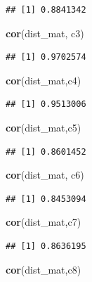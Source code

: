\documentclass[]{article}
\newenvironment{Shaded}{\begin{snugshade}}{\end{snugshade}}
\newcommand{\KeywordTok}[1]{\textcolor[rgb]{0.13,0.29,0.53}{\textbf{#1}}}
\newcommand{\NormalTok}[1]{#1}
\begin{document}
\begin{verbatim}
## [1] 0.8841342
\end{verbatim}

\begin{Shaded}
\begin{Highlighting}[]
\KeywordTok{cor}\NormalTok{(dist_mat, c3)}
\end{Highlighting}
\end{Shaded}

\begin{verbatim}
## [1] 0.9702574
\end{verbatim}

\begin{Shaded}
\begin{Highlighting}[]
\KeywordTok{cor}\NormalTok{(dist_mat,c4)}
\end{Highlighting}
\end{Shaded}

\begin{verbatim}
## [1] 0.9513006
\end{verbatim}

\begin{Shaded}
\begin{Highlighting}[]
\KeywordTok{cor}\NormalTok{(dist_mat,c5)}
\end{Highlighting}
\end{Shaded}

\begin{verbatim}
## [1] 0.8601452
\end{verbatim}

\begin{Shaded}
\begin{Highlighting}[]
\KeywordTok{cor}\NormalTok{(dist_mat, c6)}
\end{Highlighting}
\end{Shaded}

\begin{verbatim}
## [1] 0.8453094
\end{verbatim}

\begin{Shaded}
\begin{Highlighting}[]
\KeywordTok{cor}\NormalTok{(dist_mat,c7)}
\end{Highlighting}
\end{Shaded}

\begin{verbatim}
## [1] 0.8636195
\end{verbatim}

\begin{Shaded}
\begin{Highlighting}[]
\KeywordTok{cor}\NormalTok{(dist_mat,c8)}
\end{Highlighting}
\end{Shaded}
\end{document}
